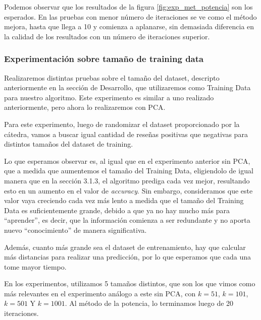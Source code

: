 Podemos observar que los resultados de la figura \ref{fig:exp_met_potencia} son los esperados.
En las pruebas con menor número de iteraciones se ve como el método mejora,
hasta que llega a 10 y comienza a aplanarse, sin demasiada diferencia
en la calidad de los resultados con un número de iteraciones superior.

\subsubsection{Experimentación sobre tamaño de training data}
Realizaremos distintas pruebas sobre el tamaño del dataset,
descripto anteriormente en la sección de Desarrollo, que utilizaremos como
Training Data para nuestro algoritmo. Este experimento es similar a uno
realizado anteriormente, pero ahora lo realizaremos con PCA.

Para este experimento, luego de randomizar el dataset proporcionado por la c\'atedra,
vamos a buscar igual cantidad de reseñas positivas que negativas para distintos tamaños
del dataset de training.

Lo que esperamos observar es, al igual que en el experimento anterior sin PCA,
que a medida que aumentemos el tamaño del Training Data, eligiendolo de igual manera que en la sección 3.1.3, el algoritmo prediga
cada vez mejor, resultando esto en un aumento en el valor de \textit{accuracy}.
Sin embargo, consideramos que este valor vaya creciendo cada vez más lento
a medida que el tamaño del Training Data es suficientemente grande,
debido a que ya no hay mucho más para ``aprender'', es decir, que la información
comienza a ser redundante y no aporta nuevo ``conocimiento'' de manera significativa.

Además, cuanto más grande sea el dataset de entrenamiento, hay que calcular
más distancias para realizar una predicción, por lo que esperamos que cada una
tome mayor tiempo.

En los experimentos, utilizamos 5 tamaños distintos, que son los que vimos como más
relevantes en el experimento análogo a este sin PCA,
con $k = 51$, $k = 101$, $k = 501$ Y $k = 1001$. Al método de la potencia, lo terminamos luego de 20 iteraciones.


